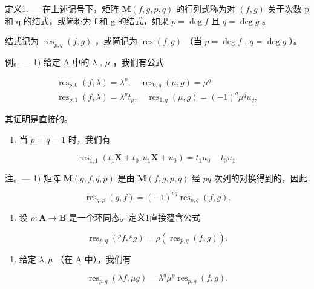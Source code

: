 定义1. --- 在上述记号下，矩阵 \(\mathbf{M}(f,g,p,q)\) 的行列式称为对 \((f,g)\) 关于次数 p 和 q 的结式，或简称为 f 和 g 的结式，如果 \(p = \deg f\) 且 \(q = \deg g\) 。

结式记为 \(\operatorname{res}_{p,q}(f,g)\) ，或简记为 \(\operatorname{res}(f,g)\) （当 \(p=\deg f\) , \(q=\deg g\) ）。

例。--- 1) 给定 A 中的 \(\lambda\) , \(\mu\) ，我们有公式

\[
\begin{array}{l} \operatorname{res} _ {p, 0} (f, \lambda) = \lambda^ {p}, \quad \operatorname{res} _ {0, q} (\mu , g) = \mu^ {q} \\ \operatorname{res} _ {p, 1} (f, \lambda) = \lambda^ {p} t _ {p}, \quad \operatorname{res} _ {1, q} (\mu , g) = (- 1) ^ {q} \mu^ {q} u _ {q}, \end{array}
\]

其证明是直接的。

\begin{enumerate}
\def\labelenumi{\arabic{enumi})}
\setcounter{enumi}{1}
\tightlist
\item
  当 \(p = q = 1\) 时，我们有
\end{enumerate}

\[
\operatorname{res} _ {1, 1} \left(t _ {1} \mathbf {X} + t _ {0}, u _ {1} \mathbf {X} + u _ {0}\right) = t _ {1} u _ {0} - t _ {0} u _ {1}.
\]

注。--- 1) 矩阵 \(\mathbf{M}(g, f, q, p)\) 是由 \(\mathbf{M}(f, g, p, q)\) 经 \(pq\) 次列的对换得到的，因此

\[
\operatorname{res} _ {q, p} (g, f) = (- 1) ^ {p q} \operatorname{res} _ {p, q} (f, g).
\]

\begin{enumerate}
\def\labelenumi{\arabic{enumi})}
\setcounter{enumi}{1}
\tightlist
\item
  设 \(\rho: \mathbf{A} \to \mathbf{B}\) 是一个环同态。定义1直接蕴含公式
\end{enumerate}

\[
\operatorname{res} _ {p, q} \left({}^ {\rho} f, {}^ {\rho} g\right) = \rho \left(\operatorname{res} _ {p, q} (f, g)\right).
\]

\begin{enumerate}
\def\labelenumi{\arabic{enumi})}
\setcounter{enumi}{2}
\tightlist
\item
  给定 \(\lambda, \mu\) （在 A 中），我们有
\end{enumerate}

\[
\operatorname{res} _ {p, q} (\lambda f, \mu g) = \lambda^ {q} \mu^ {p} \operatorname{res} _ {p, q} (f, g).\tag{28}
\]

